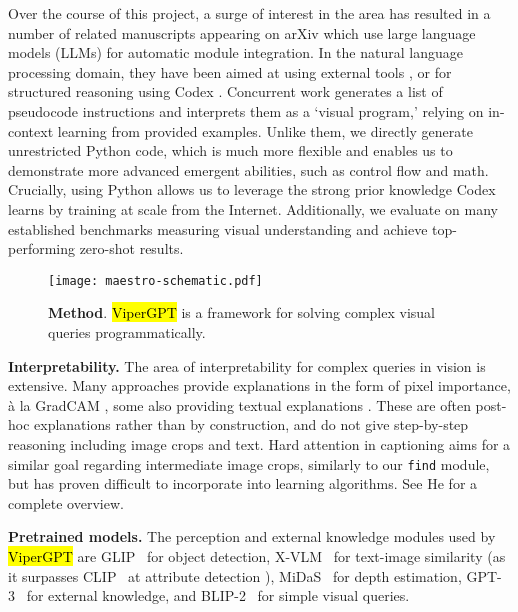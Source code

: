 \documentclass[10pt,twocolumn,letterpaper]{article}
\newcommand{\viper}[0]{{\small\fontfamily{txtt}\selectfont \textcolor{mygreen}{\hl{ViperGPT}}}\xspace}
\begin{document}
Over the course of this project, a surge of interest in the area has resulted in a number of related manuscripts appearing on arXiv which use large language models (LLMs) for automatic module integration. 
In the natural language processing domain, they have been aimed at using external tools \cite{schick2023toolformer,parisi2022talm}, or for structured reasoning using Codex \cite{madaan2022language,wang2022code4struct,gao2022pal,chen2022program}. Concurrent work \cite{gupta2022visual} generates a list of pseudocode instructions and interprets them as a `visual program,' relying on in-context learning from provided examples. Unlike them, we directly generate unrestricted Python code, which is much more flexible and enables us to demonstrate more advanced emergent abilities, such as control flow and math. Crucially, using Python allows us to leverage the strong prior knowledge Codex learns by training at scale from the Internet. Additionally, we evaluate on many established benchmarks measuring visual understanding and achieve top-performing zero-shot results.



\begin{figure}[t!]
    \centering
    \texttt{[image: maestro-schematic.pdf]}
    \caption{\textbf{Method}. \viper is a framework for solving complex visual queries programmatically.}
    \label{fig:method}
    \vspace{-0.5cm}
\end{figure}



\textbf{Interpretability.} The area of interpretability for complex queries in vision is extensive. Many approaches provide explanations in the form of pixel importance, \`a la GradCAM \cite{selvaraju_grad-cam_2020,zhang_interpretable_2018,deng_visual_nodate,park_multimodal_2018}, some also providing textual explanations \cite{park_multimodal_2018}. These are often post-hoc explanations rather than by construction, and do not give step-by-step reasoning including image crops and text. Hard attention in captioning \cite{xu_show_2016} aims for a similar goal regarding intermediate image crops, similarly to our \texttt{find} module, but has proven difficult to incorporate into learning algorithms. See He \etal \cite{he2021interpretable} for a complete overview.

\textbf{Pretrained models.} The perception and external knowledge modules used by \viper are GLIP~\cite{li2022grounded} for object detection, X-VLM~\cite{zeng2021multi} for text-image similarity (as it surpasses CLIP~\cite{radford2021learning} at attribute detection \cite{Bravo_2022_ovad}), MiDaS~\cite{Ranftl2022} for depth estimation, GPT-3~\cite{brown_language_2020} for external knowledge, and \mbox{BLIP-2}~\cite{li_blip-2_2023} for simple visual queries.
\end{document}
